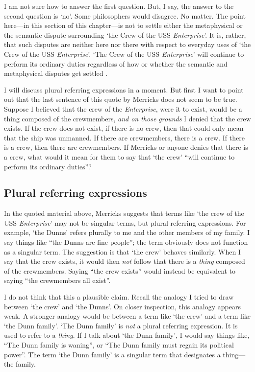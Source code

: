 \documentclass[11pt]{article}
\newenvironment{squote}{%
\begin{spacing}{1}
       	\begin{list}{}{%
\setlength{\labelwidth}{0pt}%
\rightmargin\leftmargin%
}
\item\relax
}{%
\end{list}%
\end{spacing}
}
\begin{document}
\begin{spacing}{1.25}
\begin{squote}
I am not sure how to answer the first question.  But, I say, the
answer to the second question is `no'.  Some philosophers would
disagree.  No matter.  The point here---in this section of this
chapter---is not to settle either the metaphysical or the semantic
dispute surrounding `the Crew of the USS {\em Enterprise}'.  It is,
rather, that such disputes are neither here nor there with respect to
everyday uses of `the Crew of the USS {\em Enterprise}'.  `The Crew of
the USS {\em Enterprise}' will continue to perform its ordinary duties
regardless of how or whether the semantic and metaphysical disputes
get settled \citeyearpar[10]{merricks2001a}.
\end{squote}

I will discuss plural referring expressions in a moment.  But first I
want to point out that the last sentence of this quote by Merricks
does not seem to be true.  Suppose I believed that the crew of the
{\em Enterprise}, were it to exist, would be a thing composed of the
crewmembers, {\em and on those grounds} I denied that the crew exists.
If the crew does not exist, if there is no crew, then that could only
mean that the ship was unmanned.  If there are crewmembers, there is a
crew.  If there is a crew, then there are crewmembers.  If Merricks or
anyone denies that there is a crew, what would it mean for them to say
that `the crew' ``will continue to perform its ordinary duties''?

\subsection{Plural referring expressions}
In the quoted material above, Merricks suggests that terms like `the
crew of the USS {\em Enterprise}' may not be singular terms, but
plural referring expressions.  For example, `the Dunns' refers
plurally to me and the other members of my family.  I say things like
``the Dunns are fine people''; the term obviously does not function as
a singular term.  The suggestion is that `the crew' behaves similarly.
When I say that the crew exists, it would then {\em not} follow that
there is a {\em thing} composed of the crewmembers.  Saying ``the crew
exists'' would instead be equivalent to saying ``the crewmembers all
exist''.

I do not think that this a plausible claim.  Recall the analogy I
tried to draw between `the crew' and `the Dunns'.  On closer
inspection, this analogy appears weak.  A stronger analogy would be
between a term like `the crew' and a term like `the Dunn family'.
`The Dunn family' is {\em not} a plural referring expression.  It is
used to refer to a {\em thing}.  If I talk about `the Dunn family', I
would say things like, ``The Dunn family is waning'', or ``The Dunn
family must regain its political power''.  The term `the Dunn family'
is a singular term that designates a thing---the family.


\end{spacing}
\end{document}
